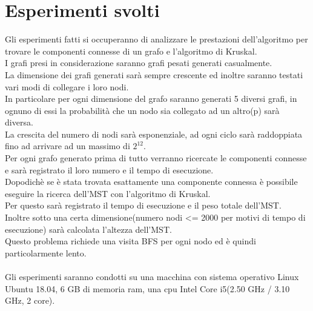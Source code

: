 \documentclass[]{article}
\begin{document}
\section{Esperimenti svolti}
Gli esperimenti fatti si occuperanno di analizzare le prestazioni dell'algoritmo per trovare le componenti connesse di un grafo e l'algoritmo di Kruskal.\\
I grafi presi in considerazione saranno grafi pesati generati casualmente.\\
La dimensione dei grafi generati sarà sempre crescente ed inoltre saranno testati vari modi di collegare i loro nodi.\\
In particolare per ogni dimensione del grafo saranno generati 5 diversi grafi, in ognuno di essi la probabilità che un nodo sia collegato ad un altro(p) sarà diversa.\\
La crescita del numero di nodi sarà esponenziale, ad ogni ciclo sarà raddoppiata fino ad arrivare ad un massimo di $2^{12}$.\\
Per ogni grafo generato prima di tutto verranno ricercate le componenti connesse e sarà registrato il loro numero e il tempo di esecuzione.\\
Dopodichè se è stata trovata esattamente una componente connessa è possibile eseguire la ricerca dell'MST con l'algoritmo di Kruskal.\\
Per questo sarà registrato il tempo di esecuzione e il peso totale dell'MST.\\
Inoltre sotto una certa dimensione(numero nodi <= 2000 per motivi di tempo di esecuzione) sarà calcolata l'altezza dell'MST.\\
Questo problema richiede una visita BFS per ogni nodo ed è quindi particolarmente lento.\\
\\
Gli esperimenti saranno condotti su una macchina con sistema operativo Linux Ubuntu 18.04, 6 GB di memoria ram, una cpu Intel Core i5(2.50 GHz / 3.10 GHz, 2 core).
\end{document}
